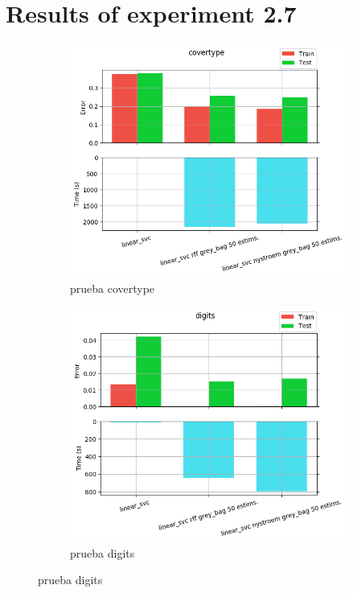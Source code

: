 
\chapter{Results of experiment 2.7} %

\label{Appendix2-7} %

\begin{figure}[ht]
  \centering
  \begin{subfigure}[b]{0.5\linewidth}
    \centering\captionsetup{width=.8\linewidth}\includegraphics[width=\imgscale\linewidth]{Figures/2_7/covertype}
    \caption{prueba covertype}
    \label{fig:2_7_covertype}
  \end{subfigure}%
  \begin{subfigure}[b]{0.5\linewidth}
    \centering\captionsetup{width=.8\linewidth}\includegraphics[width=\imgscale\linewidth]{Figures/2_7/digits}
    \caption{prueba digits}
    \label{fig:2_7_digits}
  \end{subfigure}
\end{figure}



